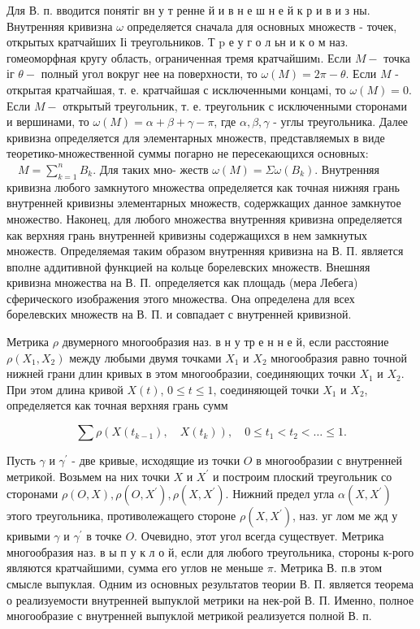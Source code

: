 \documentclass[10pt]{article}
\begin{document}
Для В. п. вводится понятіг вн у т ренне й и в н е ш н е й к р и в и з ны. Внутренняя кривизна $\omega$ определяется сначала для основных множеств - точек, открытых кратчайших Іі треугольников. Т $\mathrm{p}$ е у г о л ьн и к о м наз. гомеоморфная кругу область, ограниченная тремя кратчайшимı. Если $M-$ точка іг $\theta-$ полный угол вокруг нее на поверхности, то $\omega(M)=2 \pi-\theta$. Если $M$ - открытая кратчайшая, т. е. кратчайшая с исключенными концамі, то $\omega(M)=0$. Если $M-$ открытый треугольник, т. е. треугольник с исключенными сторонами и вершинами, то $\omega(M)=\alpha+\beta+\gamma-\pi$, где $\alpha, \beta, \gamma$ - углы треугольника. Далее кривизна определяется для элементарных множеств, представляемых в виде теоретико-множественной суммы погарно не пересекающихся основных: $\quad M=\sum_{k=1}^{n} B_{k}$. Для таких мно- жеств $\omega(M)=\Sigma \omega\left(B_{k}\right)$. Внутренняя кривизна любого замкнутого множества определяется как точная нижняя грань внутренней кривизны элементарных множеств, содержкащих данное замкнутое множество. Наконец, для любого множества внутренняя кривизна определяется как верхняя грань внутренней кривизны содержащихся в нем замкнутых множеств. Определяемая таким образом внутренняя кривизна на В. П. является вполне аддитивной функцией на кольце борелевских множеств. Внешняя кривизна множества на В. П. определяется как площадь (мера Лебега) сферического изображения этого множества. Она определена для всех борелевских множеств на В. П. и совпадает с внутренней кривизной.



Метрика $\rho$ двумерного многообразия наз. в н у тр е н н е й, если расстояние $\rho\left(X_{1}, X_{2}\right)$ между любыми двумя точками $X_{1}$ и $X_{2}$ многообразия равно точной нижней грани длин кривых в этом многообразии, соединяющих точки $X_{1}$ и $X_{2}$. При этом длина кривой $X(t)$, $0 \leqslant t \leqslant 1$, соединяющей точки $X_{1}$ и $X_{2}$, определяется как точная верхняя грань сумм



\[

\sum \rho\left(X\left(t_{k-1}\right), \quad X\left(t_{k}\right)\right), \quad 0 \leqslant t_{1}<t_{2}<\ldots \leqslant 1 .

\]



Пусть $\gamma$ и $\gamma^{\prime}$ - две кривые, исходящие из точки $O$ в многообразии с внутренней метрикой. Возьмем на них точки $X$ и $X^{\prime}$ и построим плоский треугольник со сторонами $\rho(O, X), \rho\left(O, X^{\prime}\right), \rho\left(X, X^{\prime}\right)$. Нижний предел угла $\alpha\left(X, X^{\prime}\right)$ этого треугольника, противолежащего стороне $\rho\left(X, X^{\prime}\right)$, наз. уг лом ме жд у кривыми $\gamma$ и $\gamma^{\prime}$ в точке $O$. Очевидно, этот угол всегда существует. Метрика многообразия наз. в ы п у к л о й, если для любого треугольника, стороны к-рого являются кратчайшими, сумма его углов не меньше $\pi$. Метрика В. п.в этом смысле выпуклая. Одним из основных результатов теории В. П. является теорема о реализуемости внутренней выпуклой метрики на нек-рой В. П. Именно, полное многообразие с внутренней выпуклой метрикой реализуется полной В. п.
\end{document}
